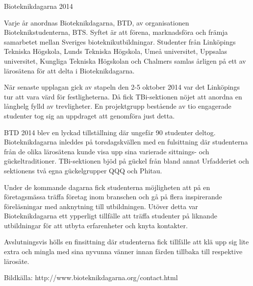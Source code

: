Bioteknikdagarna 2014

Varje år anordnas Bioteknikdagarna, BTD, av organisationen Bioteknikstudenterna, BTS. Syftet är att förena, marknadsföra och främja samarbetet mellan Sveriges bioteknikutbildningar. Studenter från Linköpings Tekniska Högskola, Lunds Tekniska Högskola, Umeå universitet, Uppsalas universitet, Kungliga Tekniska Högskolan och Chalmers samlas årligen på ett av lärosätena för att delta i Bioteknikdagarna. 

När senaste upplagan gick av stapeln den 2-5 oktober 2014 var det Linköpings tur att vara värd för festligheterna. Då fick TBi-sektionen nöjet att anordna en långhelg fylld av trevligheter.  En projektgrupp bestående av tio engagerade studenter tog sig an uppdraget att genomföra just detta.

BTD 2014 blev en lyckad tillställning där ungefär 90 studenter deltog. Bioteknikdagarna inleddes på torsdagskvällen med en fulsittning där studenterna från de olika lärosätena kunde visa upp sina varierade sittnings- och gückeltraditioner. TBi-sektionen bjöd på gückel från bland annat Urfadderiet och sektionens två egna gückelgrupper QQQ och Phitau.

Under de kommande dagarna fick studenterna möjligheten att på en företagsmässa träffa företag inom branschen och gå på flera inspirerande föreläsningar med anknytning till utbildningen. Utöver detta var Bioteknikdagarna ett ypperligt tillfälle att träffa studenter på liknande utbildningar för att utbyta erfarenheter och knyta kontakter. 

Avslutningsvis hölls en finsittning där studenterna fick tillfälle att klä upp sig lite extra och mingla med sina nyvunna vänner innan färden tillbaka till respektive lärosäte. 


Bildkälla: http://www.bioteknikdagarna.org/contact.html